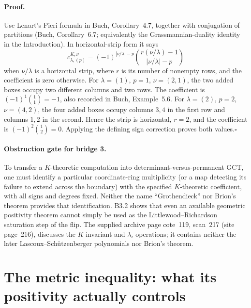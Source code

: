 \documentclass[11pt,a4paper]{article}
\begin{document}
\paragraph{Proof.}
Use Lenart's Pieri formula in Buch, Corollary~4.7, together with
conjugation of partitions (Buch, Corollary~6.7; equivalently the
Grassmannian-duality identity in the Introduction).  In horizontal-strip
form it says
\[
 c^{K,\nu}_{\lambda,(p)}=
 (-1)^{|\nu/\lambda|-p}
 \binom{r(\nu/\lambda)-1}{|\nu/\lambda|-p}
\]
when $\nu/\lambda$ is a horizontal strip, where $r$ is its number of
nonempty rows, and the coefficient is zero otherwise.  For
$\lambda=(1)$, $p=1$, $\nu=(2,1)$, the two added boxes occupy two
different columns and two rows.  The coefficient is
$(-1)^1\binom11=-1$, also recorded in Buch, Example~5.6.
For $\lambda=(2)$, $p=2$, $\nu=(4,2)$, the four added boxes occupy
columns $3,4$ in the first row and columns $1,2$ in the second.  Hence
the strip is horizontal, $r=2$, and the coefficient is
$(-1)^2\binom12=0$.  Applying the defining sign correction proves both
values.\hfill$\square$

\paragraph{Obstruction gate for bridge 3.}
To transfer a $K$-theoretic computation into determinant-versus-permanent
GCT, one must identify a particular coordinate-ring multiplicity (or a
map detecting its failure to extend across the boundary) with the
specified $K$-theoretic coefficient, with all signs and degrees fixed.
Neither the name ``Grothendieck'' nor Brion's theorem provides that
identification.  B3.2 shows that even an available geometric positivity
theorem cannot simply be used as the Littlewood--Richardson saturation
step of the flip.  The supplied archive page cote~119, scan~217
(site page~216), discusses the $K$-invariant and $\lambda_i$ operations;
it contains neither the later Lascoux--Sch\"utzenberger polynomials nor
Brion's theorem.

\section{The metric inequality: what its positivity actually controls}
\label{sec:bridge-metric}
\end{document}
